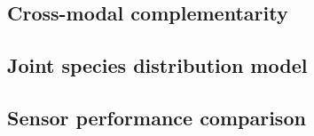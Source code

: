 \documentclass[12pt]{article}
\begin{document}
{\subsection{Cross-modal complementarity}



\subsection{Joint species distribution model}



\subsection{Sensor performance comparison}



}
\end{document}
